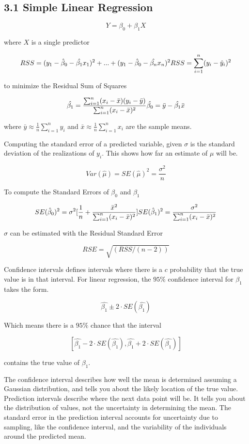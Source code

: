 \documentclass[
]{article}
\author{}
\date{}
\begin{document}
\hypertarget{header-n0}{%
\subsection{3.1 Simple Linear Regression}\label{header-n0}}

\[Y = \beta_0 + \beta_1X\]

where \(X\) is a single predictor

\[RSS = (y_1-\hat{\beta}_0-\hat{\beta_1}x_1)^2+...+(y_1-\hat{\beta}_0-\hat{\beta_n}x_n)^2\\
RSS = \sum^n_{i=1}(y_i - \hat{y}_i)^2\]

to minimize the Residual Sum of Squares

\[\hat{\beta_1} =\frac{\sum^n_{i=1}(x_i-\bar{x})(y_i-\bar{y})}{\sum^n_{i=1}(x_i-\bar{x})^2}\\
\hat{\beta_0} = \bar{y}-\hat{\beta_1}\bar{x}\]

where \(\bar{y} \approx \frac{1}{n}\sum^n_{i=1} y_i \) and
\(\bar{x} \approx \frac{1}{n}\sum^n_{i=1} x_i \) are the sample means.

Computing the standard error of a predicted variable, given \(\sigma\)
is the standard deviation of the realizations of \(y_i\). This shows how
far an estimate of \(\mu\) will be.

\[Var(\hat\mu) = SE(\hat\mu)^2 = \frac{\sigma^2}{n}\]

To compute the Standard Errors of \(\beta_0\) and \(\beta_1\)

\[SE(\hat\beta_0)^2 = \sigma^2[\frac{1}{n}+\frac{\bar{x}^2}{\sum^n_{i=1}(x_i-\bar{x})^2}]\\
SE(\hat\beta_1)^2 = \frac{\sigma^2}{\sum^n_{i=1}(x_i-\bar{x})^2}\]

\(\sigma\) can be estimated with the Residual Standard Error

\[RSE = \sqrt{(RSS/(n-2))}\]

Confidence intervals defines intervals where there is a \(c\)
probability that the true value is in that interval. For linear
regression, the \(95\%\) confidence interval for \(\beta_1\) takes the
form.

\[\hat{\beta_1} \pm 2 \cdot SE(\hat{\beta_1})\]

Which means there is a \(95\%\) chance that the interval

\[[ \hat{\beta_1} - 2 \cdot SE(\hat{\beta_1}), \hat{\beta_1} + 2 \cdot SE(\hat{\beta_1})]\]

contains the true value of \(\beta_1\).

The confidence interval describes how well the mean is determined
assuming a Gaussian distribution, and tells you about the likely
location of the true value. Prediction intervals describe where the next
data point will be. It tells you about the distribution of values, not
the uncertainty in determining the mean. The standard error in the
prediction interval accounts for uncertainty due to sampling, like the
confidence interval, and the variability of the individuals around the
predicted mean.
\end{document}
